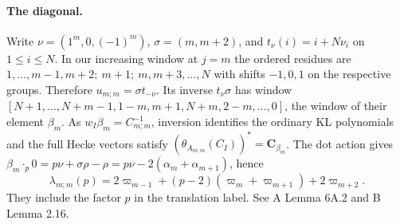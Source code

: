 \paragraph{The diagonal.}
Write \(\nu=(1^m,0,(-1)^m)\), \(\sigma=(m,m+2)\), and
\(t_\nu(i)=i+N\nu_i\) on \(1\le i\le N\). In our increasing window at \(j=m\)
the ordered residues are
\(1,\ldots,m-1,m+2;\ m+1;\ m,m+3,\ldots,N\) with shifts \(-1,0,1\)
on the respective groups. Therefore \(u_{m;m}=\sigma t_{-\nu}\).
Its inverse \(t_\nu\sigma\) has window
\([N+1,\ldots,N+m-1,1-m,m+1,N+m,2-m,\ldots,0]\), the window of their element \(\beta_m\).
As \(w_I\beta_m=C_{m;m}^{-1}\), inversion identifies the ordinary KL polynomials
and the full Hecke vectors satisfy
\((\theta_{A_{m;m}}(C_I))^*=\mathbf C_{\beta_m}\).
The dot action gives \(\beta_m\cdot_p0=p\nu+\sigma\rho-\rho
=p\nu-2(\alpha_m+\alpha_{m+1})\), hence
\[
 \lambda_{m;m}(p)=2\varpi_{m-1}+
        (p-2)(\varpi_m+\varpi_{m+1})+2\varpi_{m+2}.
\]
They include the factor \(p\) in the translation label. See A Lemma 6A.2
and B Lemma 2.16.
